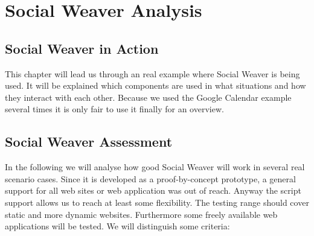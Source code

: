 \section{Social Weaver Analysis}
\subsection{Social Weaver in Action}
This chapter will lead us through an real example where Social Weaver is being used. It will be explained which components are used in what situations and how they interact with each other. Because we used the Google Calendar example several times it is only fair to use it finally for an overview.

\newpage
\subsection{Social Weaver Assessment}
In the following we will analyse how good Social Weaver will work in several real scenario cases. Since it is developed as a proof-by-concept prototype, a general support for all web sites or web application was out of reach. Anyway the script support allows us to reach at least some flexibility. The testing range should cover static and more dynamic websites. Furthermore some freely available web applications will be tested. We will distinguish some criteria:
